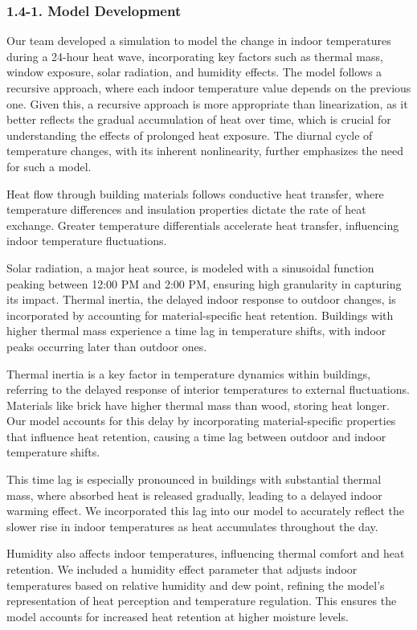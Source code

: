 \documentclass{article}
\begin{document}
\subsubsection*{1.4-1. Model Development}

Our team developed a simulation to model the change in indoor temperatures during a 24-hour heat wave, incorporating key factors such as thermal mass, window exposure, solar radiation, and humidity effects. The model follows a recursive approach, where each indoor temperature value depends on the previous one. Given this, a recursive approach is more appropriate than linearization, as it better reflects the gradual accumulation of heat over time, which is crucial for understanding the effects of prolonged heat exposure. The diurnal cycle of temperature changes, with its inherent nonlinearity, further emphasizes the need for such a model.

Heat flow through building materials follows conductive heat transfer, where temperature differences and insulation properties dictate the rate of heat exchange. Greater temperature differentials accelerate heat transfer, influencing indoor temperature fluctuations.

Solar radiation, a major heat source, is modeled with a sinusoidal function peaking between 12:00 PM and 2:00 PM, ensuring high granularity in capturing its impact. Thermal inertia, the delayed indoor response to outdoor changes, is incorporated by accounting for material-specific heat retention. Buildings with higher thermal mass experience a time lag in temperature shifts, with indoor peaks occurring later than outdoor ones.

Thermal inertia is a key factor in temperature dynamics within buildings, referring to the delayed response of interior temperatures to external fluctuations. Materials like brick have higher thermal mass than wood, storing heat longer. Our model accounts for this delay by incorporating material-specific properties that influence heat retention, causing a time lag between outdoor and indoor temperature shifts.

This time lag is especially pronounced in buildings with substantial thermal mass, where absorbed heat is released gradually, leading to a delayed indoor warming effect. We incorporated this lag into our model to accurately reflect the slower rise in indoor temperatures as heat accumulates throughout the day.

Humidity also affects indoor temperatures, influencing thermal comfort and heat retention. We included a humidity effect parameter that adjusts indoor temperatures based on relative humidity and dew point, refining the model's representation of heat perception and temperature regulation. This ensures the model accounts for increased heat retention at higher moisture levels.
\end{document}
